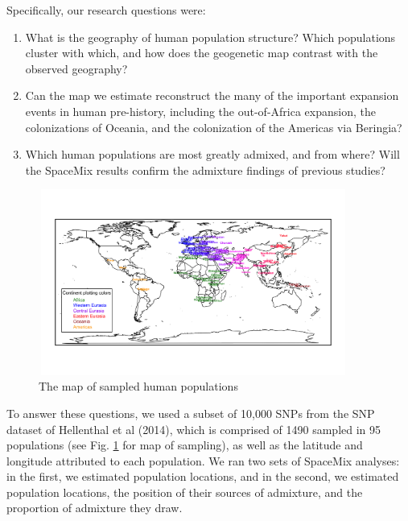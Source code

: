 \documentclass[12pt]{article}
\begin{document}
Specifically, our research questions were: 
\begin{enumerate}
\item What is the geography of human population structure?  Which populations cluster with which, and how does the geogenetic map contrast with the observed geography?
\item Can the map we estimate reconstruct the many of the important expansion events in human pre-history, including the out-of-Africa expansion, the colonizations of Oceania, and the colonization of the Americas via Beringia?
\item Which human populations are most greatly admixed, and from where?  Will the SpaceMix results confirm the admixture findings of previous studies?
\end{enumerate}

\begin{figure}
	\centering
	\includegraphics[width=4in,height=2.4in]{figs/globe_world_map_text.png}
	\caption{The map of sampled human populations}\label{globe_world_map}
\end{figure}

To answer these questions, we used a subset of 10,000 SNPs from the SNP dataset of Hellenthal et al (2014), which is comprised of 1490 sampled in 95 populations (see Fig. \ref{globe_world_map} for map of sampling), as well as the latitude and longitude attributed to each population.  We ran two sets of SpaceMix analyses: in the first, we estimated population locations, and in the second, we estimated population locations, the position of their sources of admixture, and the proportion of admixture they draw.
\end{document}
